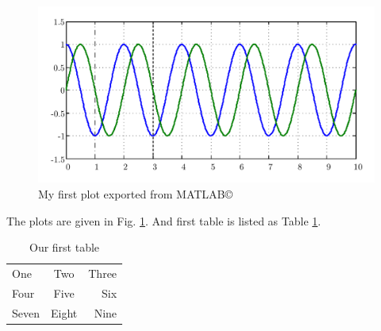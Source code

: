 \documentclass[12pt,a4paper]{article}
\begin{document}
\begin{center}

\begin{figure}
    \includegraphics[scale=0.7]{Figs/Drawing1.pdf}
    \caption{My first plot exported from MATLAB\copyright}
    \label{fig.sine}
\end{figure}

\end{center}

The plots are given in Fig. \ref{fig.sine}. And first table is listed as Table \ref{table.first}.



\begin{center}

\begin{table}[b]
  \caption{Our first table}
  \label{table.first}
  \centering
  \begin{tabular}{|l|c||r|}
  \hline
  One & Two & Three \\
  \cline{1-1}
  Four & Five & Six \\
  \cline{3-3}
  Seven & Eight & Nine \\
  \hline
  \end{tabular}
\end{table}


\end{center}
\end{document}
